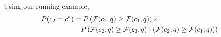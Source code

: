\begin{comment}
This formula is basically a multiplication of probabilities of the following type:
\[
P(\mathcal{F}(c, q) \geq \mathcal{F}(c_i, q) \mid \bigcap_{j=1}^{i-1} \left( \mathcal{F}(c, q) \geq \mathcal{F}(c_j, q) \right))
\]


    Hence, We need to compute probabilities of the following form:

\[
P(f(c_1) \geq f(c_2) \mid \text{conditions})
\]

This probability represents the likelihood that candidate \( c_1 \) scores higher than candidate \( c_2 \), given a set of constraints imposed by previous comparisons between candidates.

To compute this probability, we can rewrite it as follows:
\[
P(f(c_1) > f(c_2) \mid \text{constraints}) = \frac{p((f(c_1) \geq f(c_2)) \land \text{constraints})}{p(\text{constraints})} 
\]
\[
= \frac{n((f(c_1) \geq f(c_2)) \land \text{constraints})}{n(\text{constraints})}
\]

Where the denominator represents the size or number of all possible score assignments to candidates that satisfy given constraints. Similarly, the numerator is just the size of a subset of scoring assignments of the denominator that capture the additional constraint: \( f(c_1) \geq f(c_2) \). 
\end{comment}

Using our running example, 
\begin{align*}
P(c_2= c^*) &= P\left(\mathcal{F}(c_2, q) \geq \mathcal{F}(c_1, q)\right) \times \notag \\
& \quad P\left(\mathcal{F}(c_2, q) \geq \mathcal{F}(c_3, q) \mid \left( \mathcal{F}(c_2, q) \geq \mathcal{F}(c_1, q) \right)\right) 
\end{align*}


\begin{comment}
    In section \ref{winning_probability}, we will elaborate how we compute candidates winning probabilities using the above formula. Given the running example, assuming we only have $c_1, c_2$, and $c_3$ as the candidates, after computing winning probability distribution function, we will have:

\[
P(c = c^*) =
\begin{cases} 
0.75 & \text{ } c = c_1, \\
0.24 & \text{ } c = c_2, \\
0.01 & \text{ } c = c_3.
\end{cases}
\]
\end{comment}




